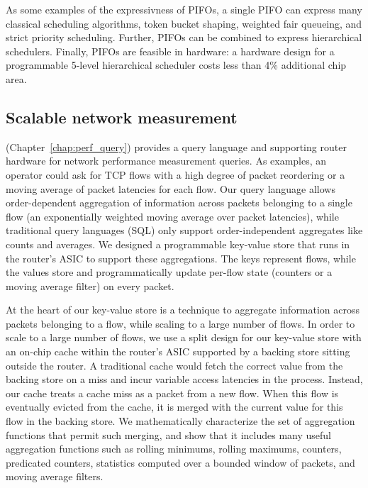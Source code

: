As some examples of the expressivness of PIFOs, a single PIFO can express many
classical scheduling algorithms, \eg token bucket shaping, weighted fair
queueing, and strict priority scheduling. Further, PIFOs can be combined to
express hierarchical schedulers. Finally, PIFOs are feasible in hardware: a
hardware design for a programmable 5-level hierarchical scheduler costs less
than 4\% additional chip area.

\subsection{Scalable network measurement}


\TheSystem (Chapter~\ref{chap:perf_query}) provides a query language and
supporting router hardware for network performance measurement queries. As
examples, an operator could ask for TCP flows with a high degree of packet
reordering or a moving average of packet latencies for each flow. Our query
language allows order-dependent aggregation of information across packets
belonging to a single flow (\eg an exponentially weighted moving average over
packet latencies), while traditional query languages (\eg SQL) only support
order-independent aggregates like counts and averages. We designed a
programmable key-value store that runs in the router's ASIC to support these
aggregations.  The keys represent flows, while the values store and
programmatically update per-flow state (\eg counters or a moving average
filter) on every packet.

At the heart of our key-value store is a technique to aggregate information
across packets belonging to a flow, while scaling to a large number of flows.
In order to scale to a large number of flows, we use a split design for our
key-value store with an on-chip cache within the router's ASIC supported by a
backing store sitting outside the router. A traditional cache would fetch the
correct value from the backing store on a miss and incur variable access
latencies in the process. Instead, our cache treats a cache miss as a packet
from a new flow. When this flow is eventually evicted from the cache, it is
merged with the current value for this flow in the backing store.  We
mathematically characterize the set of aggregation functions that permit such
merging, and show that it includes many useful aggregation functions such as
rolling minimums, rolling maximums, counters, predicated counters, statistics
computed over a bounded window of packets, and moving average filters.

